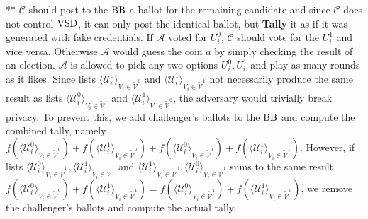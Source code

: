 ** $\mathcal{C}$ should post to the $\operatorname{BB}$ a ballot for the remaining candidate and since $\mathcal{C}$ does not control $\operatorname{VSD}$, it can only post the identical ballot, but \textbf{Tally} it as if it was generated with fake credentials. If  $\mathcal{A}$  voted for $U_i^0$, $\mathcal{C}$ should vote for the $U_i^1$ and vice versa. Otherwise  $\mathcal{A}$  would guess the coin $a$ by simply checking the result of an election. $\mathcal{A}$ is allowed to pick any two options $U_i^0,U_i^1$  and play as many rounds as it likes. Since lists $\langle \mathcal{U}^0_i \rangle _{V_i \in \tilde{\mathcal{V}}^0} $ and  $\langle \mathcal{U}^1_i \rangle _{V_i \in \tilde{\mathcal{V}}^1} $  not necessarily produce the same result as lists  $\langle \mathcal{U}^0_i \rangle _{V_i \in \tilde{\mathcal{V}}^1} $ and  $\langle \mathcal{U}^1_i \rangle _{V_i \in \tilde{\mathcal{V}}^0} $, the adversary would trivially break privacy. To prevent this, we add challenger's ballots to the $\operatorname{BB}$ and compute the combined tally, namely $f(\langle \mathcal{U}^0_i \rangle _{V_i \in \tilde{\mathcal{V}}^0} ) + f(\langle \mathcal{U}^1_i \rangle _{V_i \in \tilde{\mathcal{V}}^0} )+ f(\langle \mathcal{U}^0_i \rangle _{V_i \in \tilde{\mathcal{V}}^1} ) +  f(\langle \mathcal{U}^1_i \rangle _{V_i \in \tilde{\mathcal{V}}^1} )$. However, if lists $\langle \mathcal{U}^0_i \rangle _{V_i \in \tilde{\mathcal{V}}^0}, \langle \mathcal{U}^1_i \rangle _{V_i \in \tilde{\mathcal{V}}^1}$ and $\langle \mathcal{U}^1_i \rangle _{V_i \in \tilde{\mathcal{V}}^0}, \langle \mathcal{U}^0_i \rangle _{V_i \in \tilde{\mathcal{V}}^1}$ sums to the same result $f(\langle \mathcal{U}^0_i \rangle _{V_i \in \tilde{\mathcal{V}}^0} ) + f(\langle \mathcal{U}^1_i \rangle _{V_i \in \tilde{\mathcal{V}}^1} ) =  f(\langle \mathcal{U}^0_i \rangle _{V_i \in \tilde{\mathcal{V}}^1} ) +  f(\langle \mathcal{U}^1_i \rangle _{V_i \in \tilde{\mathcal{V}}^0} )$, we remove the challenger's ballots  and compute the actual tally. \\\\
